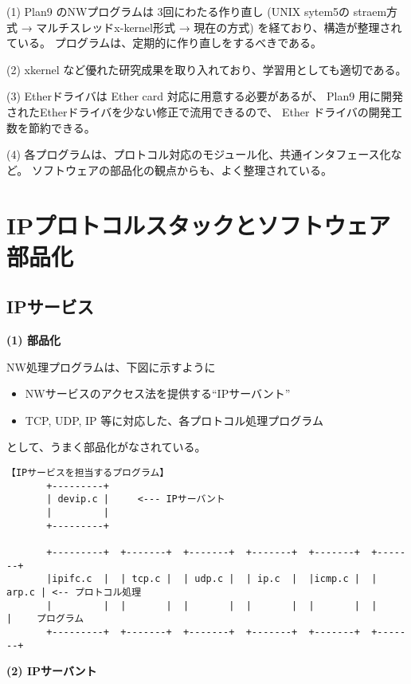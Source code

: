   (1) Plan9 のNWプログラムは 3回にわたる作り直し 
      (UNIX sytem5の straem方式 → マルチスレッドx-kernel形式 → 現在の方式)
      を経ており、構造が整理されている。
      プログラムは、定期的に作り直しをするべきである。

    (2) xkernel など優れた研究成果を取り入れており、学習用としても適切である。

    (3) Etherドライバは Ether card 対応に用意する必要があるが、 
      Plan9 用に開発されたEtherドライバを少ない修正で流用できるので、
      Ether ドライバの開発工数を節約できる。

    (4) 各プログラムは、プロトコル対応のモジュール化、共通インタフェース化など。
      ソフトウェアの部品化の観点からも、よく整理されている。


\chapter{IPプロトコルスタックとソフトウェア部品化}

\section{IPサービス}

{\bf \flushleft(1) 部品化}

NW処理プログラムは、下図に示すように
\begin{itemize}
\item  NWサービスのアクセス法を提供する``IPサーバント''
\item  TCP, UDP, IP 等に対応した、各プロトコル処理プログラム
\end{itemize}
として、うまく部品化がなされている。

{\small
\begin{verbatim}
【IPサービスを担当するプログラム】
       +---------+     
       | devip.c |     <--- IPサーバント
       |         |     
       +---------+     
                                          
       +---------+  +-------+  +-------+  +-------+  +-------+  +-------+ 
       |ipifc.c  |  | tcp.c |  | udp.c |  | ip.c  |  |icmp.c |  | arp.c | <-- プロトコル処理
       |         |  |       |  |       |  |       |  |       |  |       | 　　プログラム
       +---------+  +-------+  +-------+  +-------+  +-------+  +-------+ 
\end{verbatim}
}


{\bf \flushleft(2) IPサーバント}

